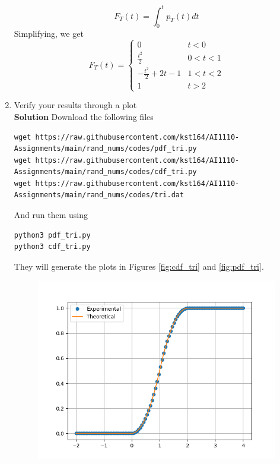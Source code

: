 \documentclass[journal, 12pt, twocolumn]{IEEEtran}
\begin{document}
\begin{enumerate}[label=\arabic{section}.\arabic*]
\begin{equation}
            F_T(t) = \int_{0}^{t}p_T(t)dt
        \end{equation}
        Simplifying, we get
        \begin{equation}
            F_T(t) = \begin{cases}
                0 & t < 0 \\
                \frac{t^2}{2} & 0 < t < 1 \\
                -\frac{t^2}{2} + 2t - 1 & 1 < t < 2 \\
                1 & t > 2
            \end{cases}
        \end{equation}

    \item
        Verify your results through a plot
        \\
        \textbf{Solution} Download the following files
        \begin{lstlisting}
wget https://raw.githubusercontent.com/kst164/AI1110-Assignments/main/rand_nums/codes/pdf_tri.py
wget https://raw.githubusercontent.com/kst164/AI1110-Assignments/main/rand_nums/codes/cdf_tri.py
wget https://raw.githubusercontent.com/kst164/AI1110-Assignments/main/rand_nums/codes/tri.dat
        \end{lstlisting}
        And run them using
        \begin{lstlisting}
python3 pdf_tri.py
python3 cdf_tri.py
        \end{lstlisting}
        They will generate the plots in Figures \eqref{fig:cdf_tri} and \eqref{fig:pdf_tri}.
        \begin{figure}[!ht]
            \includegraphics[width=\columnwidth]{figs/cdf_tri.png}

\end{figure}
\end{enumerate}
\end{document}
